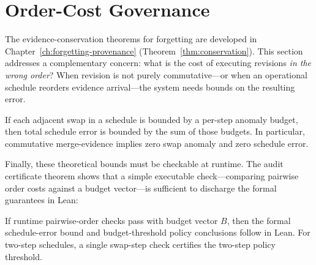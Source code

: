 \documentclass[11pt,openany]{report}
\begin{document}

\section{Order-Cost Governance}

The evidence-conservation theorems for forgetting are developed in
Chapter~\ref{ch:forgetting-provenance} (Theorem~\ref{thm:conservation}).
This section addresses a complementary concern: what is the cost of
executing revisions \emph{in the wrong order}?  When revision is not
purely commutative---or when an operational schedule reorders evidence
arrival---the system needs bounds on the resulting error.

\begin{theorem}
If each adjacent swap in a schedule is bounded by a per-step anomaly budget,
then total schedule error is bounded by the sum of those budgets.  In
particular, commutative merge-evidence implies zero swap anomaly and zero
schedule error.
\end{theorem}

Finally, these theoretical bounds must be checkable at runtime.  The
audit certificate theorem shows that a simple executable check---comparing
pairwise order costs against a budget vector---is sufficient to
discharge the formal guarantees in Lean:

\begin{theorem}
If runtime pairwise-order checks pass with budget vector $B$, then the
formal schedule-error bound and budget-threshold policy conclusions follow
in Lean.  For two-step schedules, a single swap-step check certifies the
two-step policy threshold.
\end{theorem}
\end{document}
